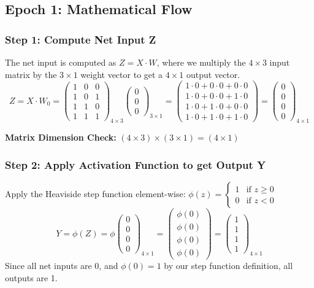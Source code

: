\subsection{Epoch 1: Mathematical Flow}
\subsubsection{Step 1: Compute Net Input Z}
The net input is computed as \(Z = X \cdot W\), where we multiply the \(4 \times 3\) input matrix by the \(3 \times 1\) weight vector to get a \(4 \times 1\) output vector.
\[
Z = X \cdot W_0 = \begin{pmatrix}
1 & 0 & 0 \\
1 & 0 & 1 \\
1 & 1 & 0 \\
1 & 1 & 1
\end{pmatrix}_{4 \times 3} \begin{pmatrix}
0 \\
0 \\
0
\end{pmatrix}_{3 \times 1} = \begin{pmatrix}
1 \cdot 0 + 0 \cdot 0 + 0 \cdot 0 \\
1 \cdot 0 + 0 \cdot 0 + 1 \cdot 0 \\
1 \cdot 0 + 1 \cdot 0 + 0 \cdot 0 \\
1 \cdot 0 + 1 \cdot 0 + 1 \cdot 0
\end{pmatrix} = \begin{pmatrix}
0 \\
0 \\
0 \\
0
\end{pmatrix}_{4 \times 1}
\]

\textbf{Matrix Dimension Check:} \((4 \times 3) \times (3 \times 1) = (4 \times 1)\) 

\subsubsection{Step 2: Apply Activation Function to get Output Y}
Apply the Heaviside step function element-wise: \(\phi(z) = \begin{cases} 1 & \text{if } z \geq 0 \\ 0 & \text{if } z < 0 \end{cases}\)
\[
Y = \phi(Z) = \phi \begin{pmatrix}
0 \\
0 \\
0 \\
0
\end{pmatrix}_{4 \times 1} = \begin{pmatrix}
\phi(0) \\
\phi(0) \\
\phi(0) \\
\phi(0)
\end{pmatrix} = \begin{pmatrix}
1 \\
1 \\
1 \\
1
\end{pmatrix}_{4 \times 1}
\]
Since all net inputs are 0, and \(\phi(0) = 1\) by our step function definition, all outputs are 1.


